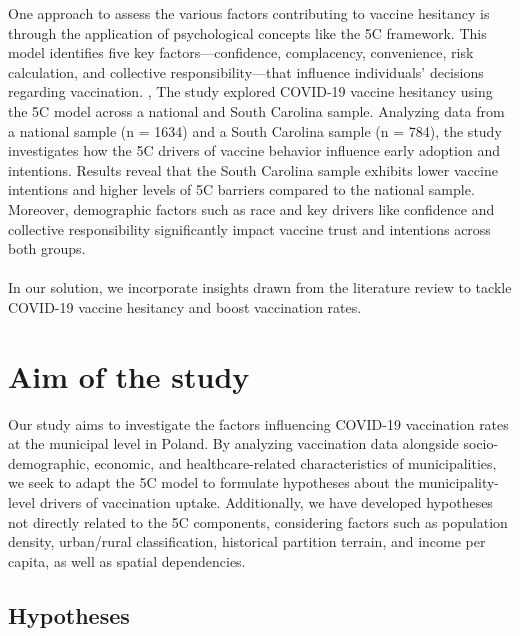 \documentclass[a4paper,12pt]{article} %
\begin{document}
One approach to assess the various factors contributing to vaccine hesitancy is through the application of psychological concepts like the 5C framework. This model identifies five key factors—confidence, complacency, convenience, risk calculation, and collective responsibility—that influence individuals' decisions regarding vaccination. \cite{10.1371/journal.pone.0208601}, \cite{Machingaidze2021} The study \cite{RANCHER2023180} explored COVID-19 vaccine hesitancy using the 5C model across a national and South Carolina sample. Analyzing data from a national sample (n = 1634) and a South Carolina sample (n = 784), the study investigates how the 5C drivers of vaccine behavior influence early adoption and intentions. Results reveal that the South Carolina sample exhibits lower vaccine intentions and higher levels of 5C barriers compared to the national sample. Moreover, demographic factors such as race and key drivers like confidence and collective responsibility significantly impact vaccine trust and intentions across both groups. 
\\
\\
In our solution, we incorporate insights drawn from the literature review to tackle COVID-19 vaccine hesitancy and boost vaccination rates.


\section{Aim of the study}
Our study aims to investigate the factors influencing COVID-19 vaccination rates at the municipal level in Poland. By analyzing vaccination data alongside socio-demographic, economic, and healthcare-related characteristics of municipalities, we seek to adapt the 5C model to formulate hypotheses about the municipality-level drivers of vaccination uptake. Additionally, we have developed hypotheses not directly related to the 5C components, considering factors such as population density, urban/rural classification, historical partition terrain, and income per capita, as well as spatial dependencies.
\subsection{Hypotheses}
\end{document}
